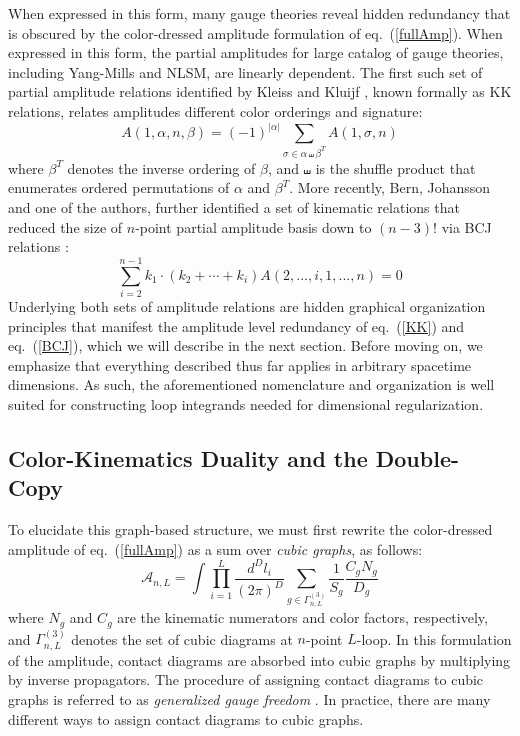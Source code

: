 \documentclass[12pt,letter]{article}
\def\eqn#1{eq.~(\ref{#1})}
\def\be{\begin{equation}}
\def\ee{\end{equation}}
\begin{document}
When expressed in this form, many gauge theories reveal hidden redundancy that is obscured by the color-dressed amplitude formulation of \eqn{fullAmp}. When expressed in this form, the partial amplitudes for large catalog \cite{BCJreview} of gauge theories, including Yang-Mills and NLSM, are linearly dependent. The first such set of partial amplitude relations identified by Kleiss and Kluijf \cite{Kleiss:1988ne}, known formally as KK relations, relates amplitudes different color orderings and signature:
\be\label{KK}
A(1,\alpha,n,\beta)=(-1)^{|\alpha|}\sum_{\sigma\in \alpha \shuffle \beta^T} A(1,\sigma,n)
\ee
where $\beta^T$ denotes the inverse ordering of $\beta$, and $\shuffle$ is the shuffle product that enumerates ordered permutations of $\alpha$ and $\beta^T$. More recently, Bern, Johansson and one of the authors, further identified a set of kinematic relations that reduced the size of $n$-point partial amplitude basis down to $(n-3)!$ via BCJ relations \cite{BCJ}:
\be\label{BCJ}
\sum_{i=2}^{n-1}k_1\cdot(k_2+\cdots +k_i) A(2,...,i,1,...,n)=0
\ee
Underlying both sets of amplitude relations are hidden graphical organization principles that manifest the amplitude level redundancy of \eqn{KK} and \eqn{BCJ}, which we will describe in the next section. Before moving on, we emphasize that everything described thus far applies in arbitrary spacetime dimensions. As such, the aforementioned nomenclature and organization is well suited for constructing loop integrands needed for dimensional regularization.
\label{subsec:AmpReview}

\subsection{Color-Kinematics Duality and the Double-Copy}
\label{subsec:DCReview}
To elucidate this graph-based structure, we must first rewrite the color-dressed amplitude of \eqn{fullAmp} as a sum over \textit{cubic graphs}, as follows:
\be\label{fullAmpCubic}
\mathcal{A}_{n,L} = \int \prod_{i=1}^L\frac{d^D l_i}{(2\pi)^D} \sum_{g\in \Gamma^{(3)}_{n,L}} \frac{1}{S_g}\frac{C_gN_g}{D_g}
\ee
where $N_g$ and $C_g$ are the kinematic numerators and color factors, respectively, and $ \Gamma^{(3)}_{n,L}$ denotes the set of cubic diagrams at $n$-point $L$-loop. In this formulation of the amplitude, contact diagrams are absorbed into cubic graphs by multiplying by inverse propagators. The procedure of assigning contact diagrams to cubic graphs is referred to as \textit{generalized gauge freedom} \cite{BCJ}. In practice, there are many different ways to assign contact diagrams to cubic graphs. 
\end{document}
